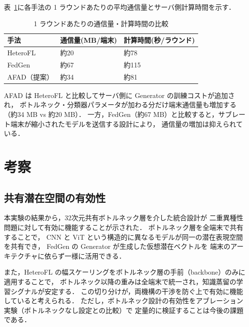 \documentclass[Japanese,noauthor]{dicomopapers}
\begin{document}
表~\ref{tab:cost}に各手法の 1 ラウンドあたりの平均通信量とサーバ側計算時間を示す．

\begin{table}[htb]
  \centering
  \caption{1 ラウンドあたりの通信量・計算時間の比較}
  \label{tab:cost}
  \begin{tabular}{lp{2.4cm}p{2.6cm}}
    \toprule
    手法 & 通信量\newline (MB/端末) & 計算時間\newline (秒/ラウンド) \\
    \midrule
    HeteroFL\cite{HeteroFL} & 約20 & 約78 \\
    FedGen\cite{FedGen}     & 約67 & 約115 \\
    AFAD（提案）            & 約34 & 約81 \\
    \bottomrule
  \end{tabular}
\end{table}

AFAD は HeteroFL と比較してサーバ側に Generator の訓練コストが追加され，
ボトルネック・分類器パラメータが加わる分だけ端末通信量も増加する（約34 MB vs 約20 MB）．
一方，FedGen（約67 MB）と比較すると，サブレート端末が縮小されたモデルを送信する設計により，
通信量の増加は抑えられている．

\section{考察}

\subsection{共有潜在空間の有効性}

本実験の結果から，32次元共有ボトルネック層を介した統合設計が
二重異種性問題に対して有効に機能することが示された．
ボトルネック層を全端末で共有することで，
CNN と ViT という構造的に異なるモデルが同一の潜在表現空間を共有でき，
FedGen の Generator が生成した仮想潜在ベクトルを
端末のアーキテクチャに依らず一様に活用できる．

また，HeteroFL の幅スケーリングをボトルネック層の手前（backbone）のみに適用することで，
ボトルネック以降の重みは全端末で統一され，知識蒸留の学習シグナルが安定する．
この切り分けが，両機構の干渉を防ぐ上で有効に機能していると考えられる．
ただし，ボトルネック設計の有効性をアブレーション実験（ボトルネックなし設定との比較）で
定量的に検証することは今後の課題である．
\end{document}

